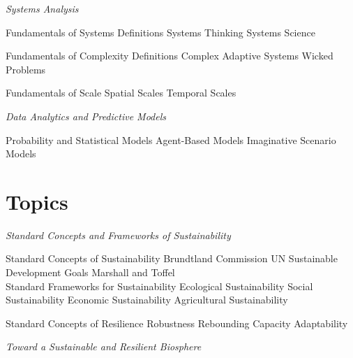 \documentclass[12pt, letterpaper]{article}
\begin{document}
\large
\begin{flushleft}
\textit{Systems Analysis}
\end{flushleft}

\normalsize

\begin{outline}[enumerate]
\1 Fundamentals of Systems
\2 Definitions
\2 Systems Thinking
\2 Systems Science

\1 Fundamentals of Complexity
\2 Definitions
\2 Complex Adaptive Systems
\2 Wicked Problems

\1 Fundamentals of Scale 
\2 Spatial Scales
\2 Temporal Scales
\end{outline}


\large
\begin{flushleft}
\textit{Data Analytics and Predictive Models}
\end{flushleft}

\normalsize
\begin{outline}[enumerate]
\1 Probability and Statistical Models
\1 Agent-Based Models
\1 Imaginative Scenario Models
\end{outline}


\section{Topics}

\large
\begin{flushleft}
\textit{Standard Concepts and Frameworks of Sustainability}
\end{flushleft}

\normalsize

\begin{outline}[enumerate]
\1 Standard Concepts of Sustainability
\2 Brundtland Commission
\2 UN Sustainable Development Goals
\2 Marshall and Toffel\\

\1 Standard Frameworks for Sustainability 
\2 Ecological Sustainability
\2 Social Sustainability
\2 Economic Sustainability
\2 Agricultural Sustainability

\1 Standard Concepts of Resilience
\2 Robustness
\2 Rebounding Capacity
\2 Adaptability
\end{outline}

\large
\begin{flushleft}
\textit{Toward a Sustainable and Resilient Biosphere}
\end{flushleft}

\normalsize
\end{document}
